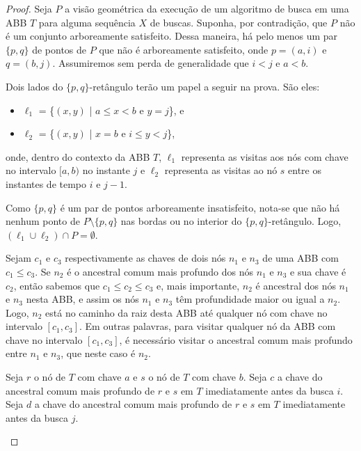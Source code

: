 \begin{proof}
Seja $P$ a visão geométrica da execução de um algoritmo de busca em uma ABB $T$ para alguma sequência $X$ de buscas.
Suponha, por contradição, que $P$ não é um conjunto arboreamente satisfeito. Dessa maneira, há pelo menos um par $\{p,q\}$ de pontos de $P$ que não é arboreamente satisfeito, onde $p = (a,i)$ e $q = (b,j)$. Assumiremos sem perda de generalidade que $i < j$ e $a < b$.

Dois lados do $\{p,q\}$-retângulo terão um papel a seguir na prova. São eles:
\begin{itemize}
    \item $\ell_1$ = \{$(x,y)$ | $a \leq x < b$ e $y = j$\}, e
    \item $\ell_2$ = \{$(x,y)$ | $x = b$ e $i \leq y < j$\},
\end{itemize}
onde, dentro do contexto da ABB $T$, $\ell_1$ representa as visitas aos nós com chave no intervalo $[a,b)$ no instante $j$ e $\ell_2$ representa as visitas ao nó $s$ entre os instantes de tempo $i$ e $j-1$.

Como $\{p,q\}$ é um par de pontos arboreamente insatisfeito, nota-se que não há nenhum ponto de $P \setminus \{p,q\}$ nas bordas ou no interior do $\{p,q\}$-retângulo. Logo, $(\ell_1 \cup \ell_2) \cap P = \emptyset$.

Sejam $c_1$ e $c_3$ respectivamente as chaves de dois nós $n_1$ e $n_3$ de uma ABB com $c_1 \leq c_3$. Se $n_2$ é o ancestral comum mais profundo dos nós $n_1$ e $n_3$ e sua chave é $c_2$, então sabemos que $c_1 \leq c_2 \leq c_3$ e, mais importante, $n_2$ é ancestral dos nós $n_1$ e $n_3$ nesta ABB, e assim os nós $n_1$ e $n_3$ têm profundidade maior ou igual a $n_2$. Logo, $n_2$ está no caminho da raiz desta ABB até qualquer nó com chave no intervalo $[c_1,c_3]$. Em outras palavras, para visitar qualquer nó da ABB com chave no intervalo $[c_1,c_3]$, é necessário visitar o ancestral comum mais profundo entre $n_1$ e $n_3$, que neste caso é $n_2$.

\begin{center}
\begin{minipage}[t]{0.6\textwidth}
    Seja $r$ o nó de $T$ com chave $a$ e $s$ o nó de $T$ com chave $b$. Seja $c$ a chave do ancestral comum mais profundo de $r$ e $s$ em $T$ imediatamente antes da busca $i$. Seja $d$ a chave do ancestral comum mais profundo de $r$ e $s$ em $T$ imediatamente antes da busca $j$.
    

\end{minipage}
\end{center}
\end{proof}
